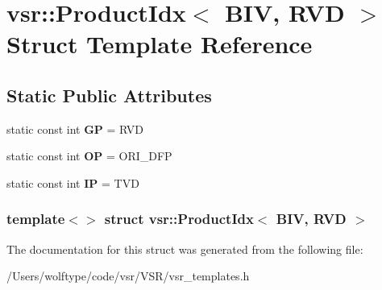 \hypertarget{structvsr_1_1_product_idx_3_01_b_i_v_00_01_r_v_d_01_4}{\section{vsr\-:\-:Product\-Idx$<$ B\-I\-V, R\-V\-D $>$ Struct Template Reference}
\label{structvsr_1_1_product_idx_3_01_b_i_v_00_01_r_v_d_01_4}
}
\subsection*{Static Public Attributes}
\begin{DoxyCompactItemize}
\item 
\hypertarget{structvsr_1_1_product_idx_3_01_b_i_v_00_01_r_v_d_01_4_a164ee12c892aa6c6d97c82e0f646fca2}{static const int {\bfseries G\-P} = R\-V\-D}\label{structvsr_1_1_product_idx_3_01_b_i_v_00_01_r_v_d_01_4_a164ee12c892aa6c6d97c82e0f646fca2}

\item 
\hypertarget{structvsr_1_1_product_idx_3_01_b_i_v_00_01_r_v_d_01_4_a68372fa34454f46bd80bd158b41574cf}{static const int {\bfseries O\-P} = O\-R\-I\-\_\-\-D\-F\-P}\label{structvsr_1_1_product_idx_3_01_b_i_v_00_01_r_v_d_01_4_a68372fa34454f46bd80bd158b41574cf}

\item 
\hypertarget{structvsr_1_1_product_idx_3_01_b_i_v_00_01_r_v_d_01_4_a48f3065e2101276cec5e4ee8ccff1e10}{static const int {\bfseries I\-P} = T\-V\-D}\label{structvsr_1_1_product_idx_3_01_b_i_v_00_01_r_v_d_01_4_a48f3065e2101276cec5e4ee8ccff1e10}

\end{DoxyCompactItemize}
\subsubsection*{template$<$$>$ struct vsr\-::\-Product\-Idx$<$ B\-I\-V, R\-V\-D $>$}



The documentation for this struct was generated from the following file\-:\begin{DoxyCompactItemize}
\item 
/\-Users/wolftype/code/vsr/\-V\-S\-R/vsr\-\_\-templates.\-h\end{DoxyCompactItemize}
